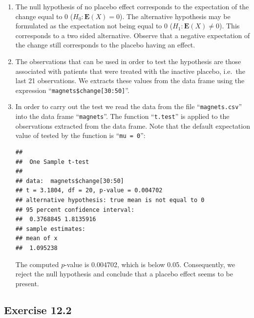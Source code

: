\documentclass[
]{krantz}
\makeatletter
\newenvironment{Shaded}{\begin{snugshade}}{\end{snugshade}}
\newcommand{\DecValTok}[1]{\textcolor[rgb]{0.00,0.00,0.81}{#1}}
\newcommand{\KeywordTok}[1]{\textcolor[rgb]{0.13,0.29,0.53}{\textbf{#1}}}
\newcommand{\NormalTok}[1]{#1}
\newcommand{\OperatorTok}[1]{\textcolor[rgb]{0.81,0.36,0.00}{\textbf{#1}}}
\newcommand{\StringTok}[1]{\textcolor[rgb]{0.31,0.60,0.02}{#1}}
\newcommand{\Expec}{\mathbf{E}}
\newenvironment{kframe}{%
\medskip{}
\setlength{\fboxsep}{.8em}
 \def\at@end@of@kframe{}%
 \ifinner\ifhmode%
  \def\at@end@of@kframe{\end{minipage}}%
  \begin{minipage}{\columnwidth}%
 \fi\fi%
 \def\FrameCommand##1{\hskip\@totalleftmargin \hskip-\fboxsep
 \colorbox{shadecolor}{##1}\hskip-\fboxsep
     \hskip-\linewidth \hskip-\@totalleftmargin \hskip\columnwidth}%
 \MakeFramed {\advance\hsize-\width
   \@totalleftmargin\z@ \linewidth\hsize
   \@setminipage}}%
 {\par\unskip\endMakeFramed%
 \at@end@of@kframe}
\renewenvironment{Shaded}{\begin{kframe}}{\end{kframe}}
\theoremstyle{definition}
\theoremstyle{definition}
\theoremstyle{definition}
\theoremstyle{remark}
\makeatother
\begin{document}
\begin{enumerate}
\def\labelenumi{\arabic{enumi}.}
\item
  The null hypothesis of no placebo
  effect corresponds to the expectation of the change equal to 0
  (\(H_0: \Expec(X) = 0\)). The alternative hypothesis may be formulated as
  the expectation not being equal to 0 (\(H_1: \Expec(X) \not = 0\)). This
  corresponds to a two sided alternative. Observe that a negative
  expectation of the change still corresponds to the placebo having an
  effect.
\item
  The observations that can be used in
  order to test the hypothesis are those associated with patients that
  were treated with the inactive placebo, i.e.~the last 21 observations.
  We extracts these values from the data frame using the expression
  ``\texttt{magnets\$change{[}30:50{]}}''.
\item
  In order to carry out the test we
  read the data from the file ``\texttt{magnets.csv}'' into the data frame
  ``\texttt{magnets}''. The function ``\texttt{t.test}'' is applied to the observations
  extracted from the data frame. Note that the default expectation value
  of tested by the function is ``\texttt{mu\ =\ 0}'':

\begin{Shaded}
\end{Shaded}

\begin{verbatim}
## 
##  One Sample t-test
## 
## data:  magnets$change[30:50]
## t = 3.1804, df = 20, p-value = 0.004702
## alternative hypothesis: true mean is not equal to 0
## 95 percent confidence interval:
##  0.3768845 1.8135916
## sample estimates:
## mean of x 
##  1.095238
\end{verbatim}

  The computed \(p\)-value is 0.004702, which is below 0.05. Consequently,
  we reject the null hypothesis and conclude that a placebo effect seems
  to be present.
\end{enumerate}

\hypertarget{exercise-12.2}{%
\subsection*{Exercise 12.2}\label{exercise-12.2}}
\end{document}
